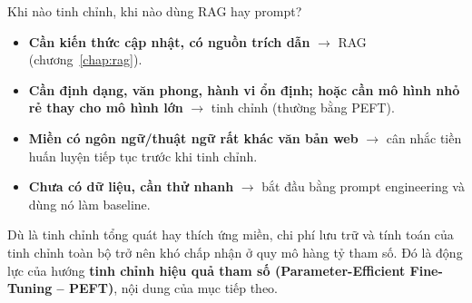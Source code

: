 \begin{keyidea}{Khi nào tinh chỉnh, khi nào dùng RAG hay prompt?}
\begin{itemize}
	\item \textbf{Cần kiến thức cập nhật, có nguồn trích dẫn} $\rightarrow$ RAG (chương~\ref{chap:rag}).
	\item \textbf{Cần định dạng, văn phong, hành vi ổn định; hoặc cần mô hình nhỏ rẻ thay cho mô hình lớn} $\rightarrow$ tinh chỉnh (thường bằng PEFT).
	\item \textbf{Miền có ngôn ngữ/thuật ngữ rất khác văn bản web} $\rightarrow$ cân nhắc tiền huấn luyện tiếp tục trước khi tinh chỉnh.
	\item \textbf{Chưa có dữ liệu, cần thử nhanh} $\rightarrow$ bắt đầu bằng prompt engineering và dùng nó làm baseline.
\end{itemize}
\end{keyidea}

Dù là tinh chỉnh tổng quát hay thích ứng miền, chi phí lưu trữ và tính toán của tinh chỉnh toàn bộ trở nên khó chấp nhận ở quy mô hàng tỷ tham số. Đó là động lực của hướng \textbf{tinh chỉnh hiệu quả tham số (Parameter-Efficient Fine-Tuning -- PEFT)}, nội dung của mục tiếp theo.